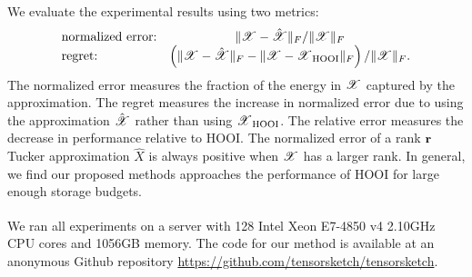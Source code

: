 We evaluate the experimental results using two metrics:
\[
\begin{array}{lc}
\mbox{normalized error:} & \|\T{X} - \hat{\T{X}}\|_F / \|\T{X}\|_F \\
\mbox{regret:} & \left(\|\T{X} - \hat{\T{X}}\|_F - \|\T{X} - \T{X}_\text{HOOI}\|_F \right) / \|\T{X}\|_F.
\end{array}
\]
The normalized error measures the fraction of the energy in $\T{X}$
captured by the approximation.
The regret measures the increase in normalized error due to
using the approximation $\hat{\T{X}}$ rather than using $\T{X}_\text{HOOI}$.
The relative error measures the decrease in performance relative to HOOI.
The normalized error of a rank $\mathbf{r}$ Tucker approximation $\hat{X}$
is always positive when $\T{X}$ has a larger rank.
In general, we find our proposed methods approaches the performance of HOOI
for large enough storage budgets.

We ran all experiments on a server with 128 Intel\textsuperscript{\textregistered} Xeon\textsuperscript{\textregistered} E7-4850 v4 2.10GHz CPU cores and 1056GB memory.
The code for our method is available at an anonymous Github repository \url{https://github.com/tensorsketch/tensorsketch}.

